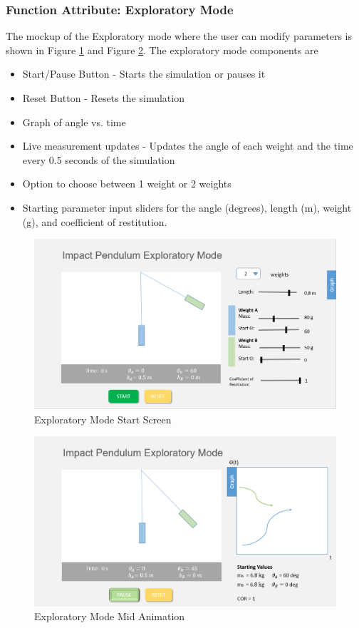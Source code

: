 \documentclass[onecolumn, draftclsnofoot,10pt, compsoc]{IEEEtran}
\begin{document}
\subsubsection{Function Attribute: Exploratory Mode}
The mockup of the Exploratory mode where the user can modify parameters is shown in Figure \ref{fig:explore_start} and Figure \ref{fig:explore_mid}. 
The exploratory mode components are
\begin{itemize}
  \item Start/Pause Button - Starts the simulation or pauses it 
    \item Reset Button - Resets the simulation
    \item Graph of angle vs. time 
    \item Live measurement updates  - Updates the angle of each weight and the time every 0.5 seconds of the simulation
    \item Option to choose between 1 weight or 2 weights
    \item Starting parameter input sliders for the angle (degrees), length (m), weight (g), and coefficient of restitution.
\end{itemize}
\begin{figure}[H]
  \includegraphics[width=\textwidth]{new_explore_s.png}
  \caption{Exploratory Mode Start Screen}
  \label{fig:explore_start}
\end{figure}
\begin{figure}[H]
  \includegraphics[width=\textwidth]{new_explore_mid.png}
  \caption{Exploratory Mode Mid Animation}
  \label{fig:explore_mid}
\end{figure}
\end{document}
